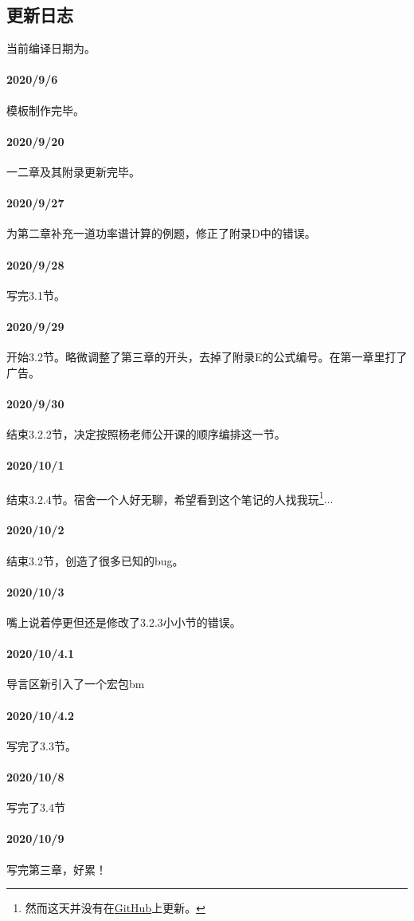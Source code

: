 \subsection{更新日志}
    当前编译日期为。
    \paragraph{2020/9/6}模板制作完毕。
    \paragraph{2020/9/20}一二章及其附录更新完毕。
    \paragraph{2020/9/27}为第二章补充一道功率谱计算的例题，修正了附录D中的错误。
    \paragraph{2020/9/28}写完3.1节。
    \paragraph{2020/9/29}开始3.2节。略微调整了第三章的开头，去掉了附录E的公式编号。在第一章里打了广告。
    \paragraph{2020/9/30}结束3.2.2节，决定按照杨老师公开课的顺序编排这一节。
    \paragraph{2020/10/1}结束3.2.4节。宿舍一个人好无聊，希望看到这个笔记的人找我玩\footnote{然而这天并没有在\href{https://github.com/phydx0803/BuptPoCNoteBook/}{GitHub}上更新。}$\ldots$
    \paragraph{2020/10/2}结束3.2节，创造了很多已知的bug。
    \paragraph{2020/10/3}嘴上说着停更但还是修改了3.2.3小小节的错误。
    \paragraph{2020/10/4.1}导言区新引入了一个宏包{\ttfamily bm}
    \paragraph{2020/10/4.2}写完了3.3节。
    \paragraph{2020/10/8}写完了3.4节
    \paragraph{2020/10/9}写完第三章，好累！